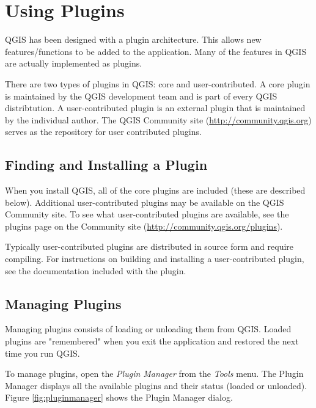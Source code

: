 \chapter{Using Plugins}
QGIS has been designed with a plugin architecture. This allows new features/functions to be added to the application. Many of the features in QGIS are actually implemented as plugins.

There are two types of plugins in QGIS: core and user-contributed.
A core plugin is maintained by the QGIS development team and is part of every QGIS distribtution. A user-contributed plugin is an external plugin that is maintained by the individual author. The QGIS Community site (\url{http://community.qgis.org}) serves as the repository for user contributed plugins.

\section{Finding and Installing a Plugin}
When you install QGIS, all of the core plugins are included (these are described
below). Additional user-contributed plugins may be
available on the QGIS Community site. To see what user-contributed plugins are
available, see the plugins page on the Community site
(\url{http://community.qgis.org/plugins}).

Typically user-contributed plugins are distributed in source form and require compiling. For instructions on building and installing a user-contributed plugin, see the documentation included with the plugin.
\section{Managing Plugins}\label{sec:managing_plugins}
Managing plugins consists of loading or unloading them from QGIS. Loaded plugins are "remembered" when you exit the application and restored the next time you run QGIS.

To manage plugins, open the \textsl{Plugin Manager} from the \textsl{Tools}
menu. The Plugin Manager displays all the available plugins and their status (loaded or unloaded). Figure \ref{fig:pluginmanager} shows the Plugin Manager dialog.

